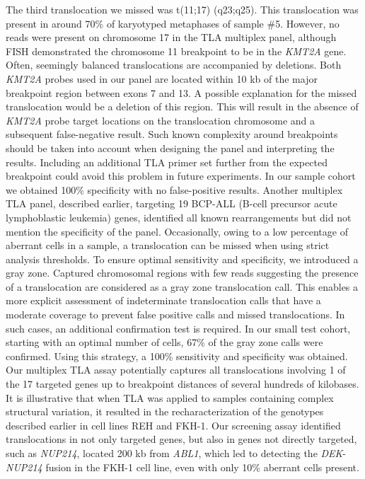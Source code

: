 The third translocation we missed was t(11;17) (q23;q25). 
This translocation was present in around 70\% of karyotyped metaphases of sample \#5. 
However, no reads were present on chromosome 17 in the TLA multiplex panel, although FISH demonstrated the chromosome 11 breakpoint to be in the \textsl{KMT2A} gene.
Often, seemingly balanced translocations are accompanied by deletions\cite{Mertens_2015}.
Both \textsl{KMT2A} probes used in our panel are located within 10 kb of the major breakpoint region between exons 7 and 13\cite{Burmeister_2015}. 
A possible explanation for the missed translocation would be a deletion of this region. 
This will result in the absence of \textsl{KMT2A} probe target locations on the translocation chromosome and a subsequent false-negative result. 
Such known complexity around breakpoints should be taken into account when designing the panel and interpreting the results. 
Including an additional TLA primer set further from the expected breakpoint could avoid this problem in future experiments. 
In our sample cohort we obtained 100\% specificity with no false-positive results. 
Another multiplex TLA panel, described earlier, targeting 19 BCP-ALL (B-cell precursor acute lymphoblastic leukemia) genes, identified all known rearrangements but did not mention the specificity of the panel\cite{Kuiper_2015}.
Occasionally, owing to a low percentage of aberrant cells in a sample, a translocation can be missed when using strict analysis thresholds. 
To ensure optimal sensitivity and specificity, we introduced a gray zone. 
Captured chromosomal regions with few reads suggesting the presence of a translocation are considered as a gray zone translocation call. 
This enables a more explicit assessment of indeterminate translocation calls that have a moderate coverage to prevent false positive calls and missed translocations.
In such cases, an additional confirmation test is required.
In our small test cohort, starting with an optimal number of cells, 67\% of the gray zone calls were confirmed. 
Using this strategy, a 100\% sensitivity and specificity was obtained. 
Our multiplex TLA assay potentially captures all translocations involving 1 of the 17 targeted genes up to breakpoint distances of several hundreds of kilobases. 
It is illustrative that when TLA was applied to samples containing complex structural variation, it resulted in the recharacterization of the genotypes described earlier in cell lines REH and FKH-1. 
Our screening assay identified translocations in not only targeted genes, but also in genes not directly targeted, such as \textsl{NUP214}, located 200 kb from \textsl{ABL1}, which led to detecting the \textsl{DEK}-\textsl{NUP214} fusion in the FKH-1 cell line, even with only 10\% aberrant cells present.
